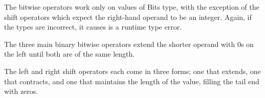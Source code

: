 \begin{prooftree}
\end{prooftree}

\begin{prooftree}
\end{prooftree}

\begin{prooftree}
\end{prooftree}

\begin{prooftree}
\end{prooftree}

\FloatBarrier

The bitwise operators work only on values of Bits type, with the exception
of the shift operators which expect the right-hand operand to be an integer.
Again, if the types are incorrect, it causes is a runtime type error.

The three main binary bitwise operators extend the shorter operand with 0s on
the left until both are of the same length.

The left and right shift operators each come in three forms; one that extends,
one that contracts, and one that maintains the length of the value, filling the
tail end with zeros.

\begin{prooftree}
\end{prooftree}

\begin{prooftree}
\end{prooftree}


